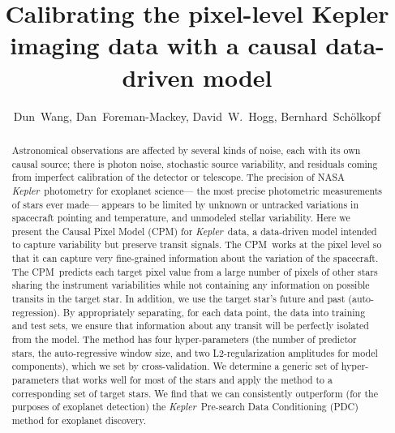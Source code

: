 \documentclass[12pt, preprint]{aastex}
\newcommand{\project}[1]{\textsl{#1}}
\newcommand{\Kepler}{\project{Kepler}}
\newcommand{\name}{CPM}
\begin{document}
\title{
  Calibrating the pixel-level Kepler imaging data with a causal data-driven model
 \\ 
}
\author{%
  Dun~Wang\altaffilmark{\ref{CCPP}},
  Dan~Foreman-Mackey\altaffilmark{\ref{CCPP}},
  David~W.~Hogg\altaffilmark{\ref{CCPP},\ref{CDS},\ref{MPIA},\ref{email}},
  Bernhard~Sch\"olkopf\altaffilmark{\ref{MPIIS}}
  }
\setcounter{address}{1}



\begin{abstract}
Astronomical observations are affected by several kinds of noise, each with its own causal source; 
there is photon noise, stochastic source variability, and residuals coming from imperfect calibration of the detector or telescope. 
The precision of NASA \Kepler\ photometry for exoplanet science---%
the most precise photometric measurements of stars ever made---%
appears to be limited by unknown or untracked variations in spacecraft pointing and temperature, 
and unmodeled stellar variability. Here we present the Causal Pixel Model (\name) for \Kepler\ data, 
a data-driven model intended to capture variability but preserve transit signals. 
The \name\ works at the pixel level so that
it can capture very fine-grained information about the variation of the spacecraft.
The \name\ predicts each target pixel value from a large number of pixels of other stars sharing the instrument variabilities 
while not containing any information on possible transits in the target star. In addition, we use the target star’s future and past (auto-regression). 
By appropriately separating, for each data point, the data into training and test sets, 
  we ensure that information about any transit will be perfectly isolated from the model. 
The method has four hyper-parameters (the number of predictor stars, the auto-regressive window size, 
and two L2-regularization amplitudes for model components), which we set by cross-validation. 
We determine a generic set of hyper-parameters that works well for most of the stars and apply the method to a corresponding set of target stars. 
We find that we can consistently outperform (for the purposes of exoplanet detection) 
  the \Kepler\ Pre-search Data Conditioning (PDC) method for exoplanet discovery.

\end{abstract}
\end{document}
